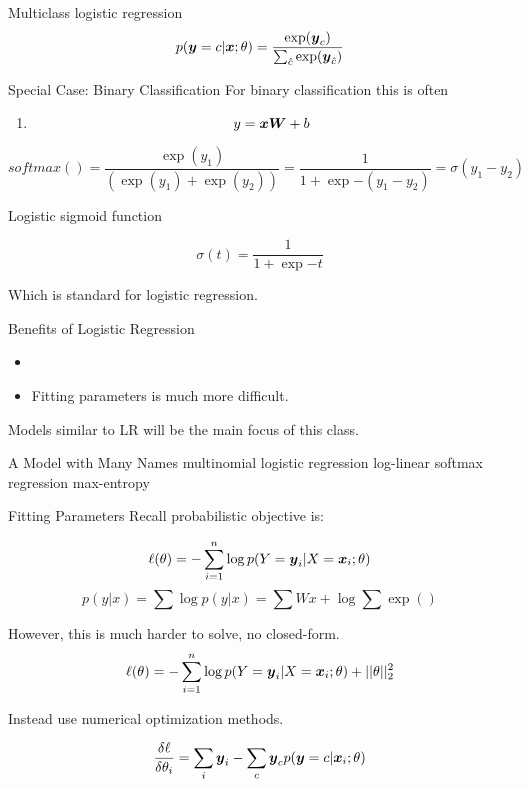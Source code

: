 \documentclass{beamer}
\begin{document}
\begin{frame}{Multiclass logistic regression}
    \[ p(\boldsymbol{y} =c | \boldsymbol{x}; \theta) = \frac{\exp(\boldsymbol{y}_c)}{\sum_{\hat{c}} \exp(\boldsymbol{y}_{\hat{c}})}   \] 
\end{frame}

\begin{frame}{Special Case: Binary Classification}
  For binary classification this is often 
  \begin{enumerate}
  \item   \[y = \boldsymbol{x} \boldsymbol{W} + b\]   
  \end{enumerate}

  \[ softmax() = \frac{\exp(y_1)}{(\exp(y_1) + \exp(y_2))} = \frac{1}{1 + \exp{-(y_1-y_2)}} = \sigma(y_1 -y_2)\]

  
  Logistic sigmoid function

  \[\sigma(t) = \frac{1}{1 + \exp{-t}} \]
  
  Which is standard for logistic regression.
\end{frame}

\begin{frame}{Benefits of Logistic Regression}
  \begin{itemize}
  \item 
  \end{itemize}
  \begin{itemize}
  \item Fitting parameters is much more difficult.
  \end{itemize}
  Models similar to LR will be the main focus of this class.
\end{frame}

\begin{frame}{A Model with Many Names}
  multinomial logistic regression
  log-linear
  softmax regression
  max-entropy
\end{frame}


\begin{frame}{Fitting Parameters}
  Recall probabilistic objective is:

  \[ \ell(\theta) = - \sum_{i=1}^n \log p(Y = \boldsymbol{y}_i | X = \boldsymbol{x}_i; \theta) \] 
  \[ p(y | x) = \sum \log p(y| x) = \sum W x + \log \sum \exp()   \] 

  However, this is much harder to solve, no closed-form.
  \[ \ell(\theta) = - \sum_{i=1}^n \log p(Y = \boldsymbol{y}_i | X = \boldsymbol{x}_i; \theta) + ||\theta||^2_2\] 

  Instead use numerical optimization methods.
  
  \[\frac{\delta \ell}{\delta \theta_i} = \sum_i \boldsymbol{y}_i - \sum_{c} \boldsymbol{y}_c p(\boldsymbol{y} =c | \boldsymbol{x}_i ;\theta) \]
\end{frame}
\end{document}
